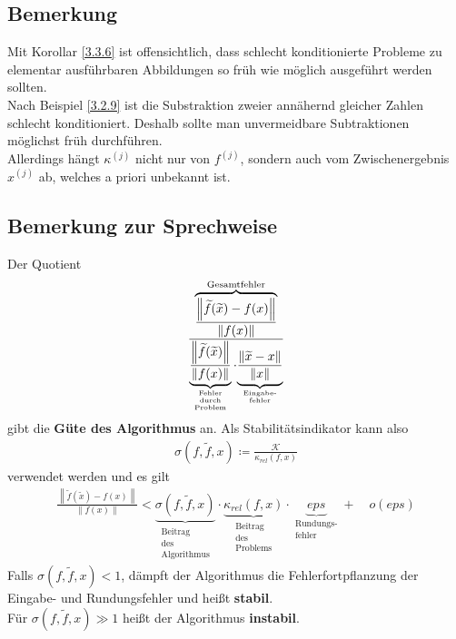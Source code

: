 \documentclass[ngerman,fontsize=11pt, paper=a4, parskip=half, titlepage=true, toc=bib]{scrbook}
\newcommand{\K}{\mathcal{K}}
\newcommand{\nn}[1]{\left\| #1 \right\|}
\begin{document}
\subsection{Bemerkung}
Mit Korollar \ref{3.3.6} ist offensichtlich, dass schlecht konditionierte Probleme 
zu elementar ausführbaren Abbildungen so früh wie möglich ausgeführt werden sollten. \\
Nach Beispiel \ref{3.2.9} ist die Substraktion zweier annähernd gleicher Zahlen schlecht konditioniert.
Deshalb sollte man unvermeidbare Subtraktionen möglichst früh durchführen. \\
Allerdings hängt $\kappa^{(j)}$ nicht nur von $f^{(j)}$, sondern auch vo\nocite{*}m Zwischenergebnis $x^{(j)}$ ab, welches a priori unbekannt ist.

\subsection{Bemerkung zur Sprechweise} %
Der Quotient 
\begin{gather}
	\frac{\overbrace{\frac{\nn{\widetilde{f}(\widetilde{x})-f(x)}}{\nn{f(x)}}}^{
				\text{Gesamtfehler}}}
		{\underbrace{\frac{\nn{\widetilde{f}(\widetilde{x})}}{\nn{f(x)}}}_{
				\scriptsize\substack{
					\text{Fehler} \\
					\text{durch} \\
					\text{Problem}
				}}
			\cdot
		 {\underbrace{\frac{\nn{\widetilde{x}-x}}{\nn{x}}}_{
		 		\scriptsize\substack{\text{Eingabe-} \\ \text{fehler}}}}}
	\label{III.3.6}
\end{gather}
gibt die \textbf{Güte des Algorithmus}  an.
Als Stabilitätsindikator kann also 
\begin{gather}
	\sigma\left(f, \widetilde{f}, x\right) \coloneqq \frac{\K}{\kappa_{rel}(f, x)}
	\label{III.3.7}
\end{gather}
 verwendet werden und es gilt
 \begin{gather*}
	\frac{\nn{\widetilde{f}(\widetilde{x})-f(x)}}{\nn{f(x)}}
		< \underbrace{\sigma\left( f,\widetilde{f}, x\right) }_{
								\substack{\text{Beitrag}\\
												 \text{des} \\
												 \text{Algorithmus}}}
		   \cdot \underbrace{\kappa_{rel}(f,x)}_{
		   						\substack{\text{Beitrag} \\
		   										 \text{des} \\
		   										 \text{Problems}}}
		   	\cdot \underbrace{eps}_{\substack{\text{Rundungs-}\\\text{fehler}}}
		    + \quad o(eps)
 \end{gather*}
Falls $\sigma( f,\widetilde{f}, x)  < 1$, dämpft der Algorithmus die Fehlerfortpflanzung der Eingabe- und Rundungsfehler und heißt \textbf{stabil}. \\
Für $\sigma( f,\widetilde{f}, x)  \gg 1$ heißt der Algorithmus \textbf{instabil}.
\end{document}
